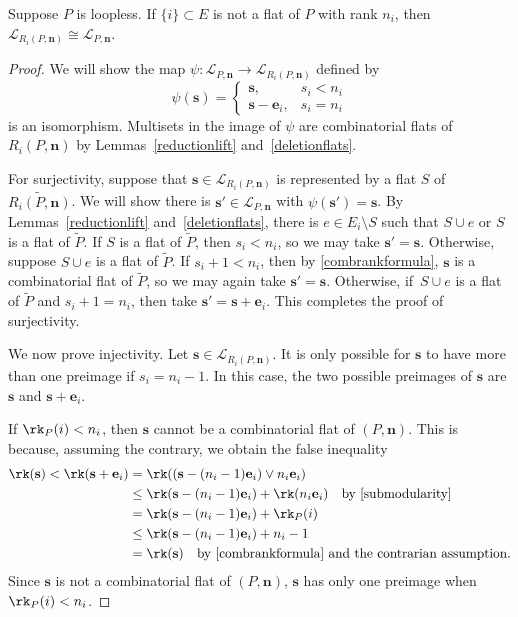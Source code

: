 \begin{lemm}\label{reductioniso}
  Suppose $P$ is loopless.
If  $\{i\} \subset E$ is not a flat of $P$ with rank $n_i$, then $\mathcal L_{R_i(P, \mathbf n)} \cong \mathcal L_{P, \mathbf n}$.
\end{lemm}
\begin{proof}
  We will show the map $\psi: \mathcal L_{P, \mathbf n} \to \mathcal L_{R_i(P, \mathbf n)}$ defined by
  \[ \psi(\mathbf s) = \begin{cases}
    \mathbf s, & s_i < n_i \\
    \mathbf s - \mathbf e_i, & s_i = n_i
  \end{cases}
\]
is an isomorphism.
Multisets in the image of $\psi$ are combinatorial flats of $R_i(P, \mathbf n)$ by Lemmas~\ref{reductionlift} and~\ref{deletionflats}.

For surjectivity, suppose that $\mathbf s \in \mathcal L_{R_i(P, \mathbf n)}$ is represented by a flat $S$ of $\widetilde{R_i(P, \mathbf n)}$.
We will show there is $\mathbf s' \in \mathcal L_{P, \mathbf n}$ with $\psi(\mathbf s') = \mathbf s$.
By Lemmas~\ref{reductionlift} and~\ref{deletionflats},  there is $e \in E_i \setminus S$ such that $S \cup e$ or $S$ is a flat of $\widetilde P$.
If $S$ is a flat of $\widetilde P$, then $s_i < n_i$, so we may take $\mathbf s' = \mathbf s$.
Otherwise, suppose $S \cup e$ is a flat of $\widetilde P$.
If $s_i + 1 < n_i$, then by \cref{combrankformula}, $\mathbf s$ is a combinatorial flat of $\widetilde P$, so we may again take $\mathbf s' = \mathbf s$.
Otherwise, if~$S \cup e$ is a flat of $\widetilde P$ and $s_i + 1 = n_i$, then take $\mathbf s' = \mathbf s + \mathbf e_i$.
This completes the proof of surjectivity.


We now prove injectivity.
Let $\mathbf s \in \mathcal L_{R_i(P, \mathbf n)}$.
It is only possible for $\mathbf s$ to have more than one preimage if $s_i = n_i - 1$.
In this case, the two possible preimages of $\mathbf s$ are $\mathbf s$ and $\mathbf s + \mathbf e_i$.

If $\rk_P(i) < n_i$, then $\mathbf s$ cannot be a combinatorial flat of $(P, \mathbf n)$.
This is because, assuming the contrary, we obtain the false inequality
\begin{align*}
  \rk(\mathbf s) < \rk(\mathbf s + \mathbf e_i)
  &= \rk((\mathbf s - (n_i-1) \mathbf e_i) \vee n_i \mathbf e_i) \\
  &\leq \rk(\mathbf s - (n_i-1) \mathbf e_i) + \rk(n_i \mathbf e_i) \quad \text{by \cref{submodularity}}\\
  &= \rk(\mathbf s - (n_i-1) \mathbf e_i) + \rk_P(i) \\
  &\leq \rk(\mathbf s - (n_i-1) \mathbf e_i) + n_i - 1 \\
  & = \rk(\mathbf s) \quad \text{by \cref{combrankformula} and the contrarian assumption.}
\end{align*}
Since $\mathbf s$ is not a combinatorial flat of $(P, \mathbf n)$, $\mathbf s$ has only one preimage when $\rk_P(i) < n_i$.


\end{proof}
